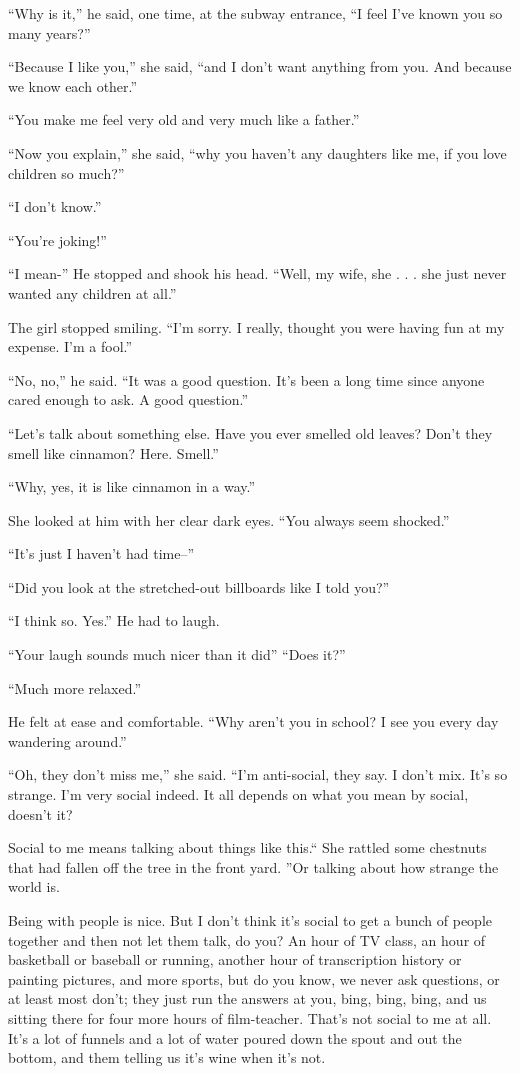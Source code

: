 \documentclass[11pt,openany]{book}
\begin{document}
``Why is it,'' he said, one time, at the subway entrance, ``I feel I've known you so many years?''

``Because I like you,'' she said, ``and I don't want anything from you. And because we know each other.''

``You make me feel very old and very much like a father.''

``Now you explain,'' she said, ``why you haven't any daughters like me, if you love children so much?''

``I don't know.''

``You're joking!''

``I mean-'' He stopped and shook his head. ``Well, my wife, she . . . she just never wanted any children at all.''

The girl stopped smiling. ``I'm sorry. I really, thought you were having fun at my expense. I'm a fool.''

``No, no,'' he said. ``It was a good question. It's been a long time since anyone cared enough to ask. A good question.''

``Let's talk about something else. Have you ever smelled old leaves? Don't they smell like cinnamon? Here. Smell.''

``Why, yes, it is like cinnamon in a way.''

She looked at him with her clear dark eyes. ``You always seem shocked.''

``It's just I haven't had time--''

``Did you look at the stretched-out billboards like I told you?''

``I think so. Yes.'' He had to laugh.

``Your laugh sounds much nicer than it did'' ``Does it?''

``Much more relaxed.''

He felt at ease and comfortable. ``Why aren't you in school? I see you every day wandering around.''

``Oh, they don't miss me,'' she said. ``I'm anti-social, they say. I don't mix. It's so strange. I'm very social indeed. It all depends on what you mean by social, doesn't it?

Social to me means talking about things like this.`` She rattled some chestnuts that had fallen off the tree in the front yard. ''Or talking about how strange the world is.

Being with people is nice. But I don't think it's social to get a bunch of people together and then not let them talk, do you? An hour of TV class, an hour of basketball or baseball or running, another hour of transcription history or painting pictures, and more sports, but do you know, we never ask questions, or at least most don't; they just run the answers at you, bing, bing, bing, and us sitting there for four more hours of film-teacher. That's not social to me at all. It's a lot of funnels and a lot of water poured down the spout and out the bottom, and them telling us it's wine when it's not.
\end{document}
